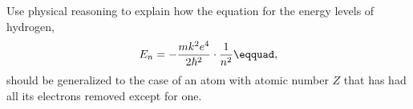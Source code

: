 Use physical reasoning to explain how the equation for
the energy levels of hydrogen,
\begin{equation*}
         E_n = -\frac{mk^2e^4}{2\hbar^2}\cdot\frac{1}{n^2}\eqquad,  
\end{equation*}
should be generalized to the case of an atom with
atomic number $Z$ that has had all its electrons removed
except for one.
